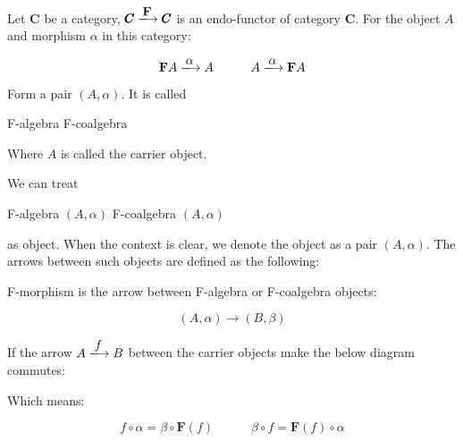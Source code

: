 \documentclass{article}
\begin{document}
\begin{definition}
Let $\pmb{C}$ be a category, $\pmb{C} \arrowto{\mathbf{F}} \pmb{C}$ is an endo-functor of category $\pmb{C}$. For the object $A$ and morphism $\alpha$ in this category:

\[
  \mathbf{F} A \arrowto{\alpha} A
  \quad \quad \quad
  A \arrowto{\alpha} \mathbf{F} A
\]

Form a pair $(A, \alpha)$. It is called

\begin{center}
  F-algebra \quad \quad \quad F-coalgebra
\end{center}

Where $A$ is called the carrier object.
\end{definition}

We can treat

\begin{center}
  F-algebra $(A, \alpha)$ \quad \quad \quad F-coalgebra $(A, \alpha)$
\end{center}

as object. When the context is clear, we denote the object as a pair $(A, \alpha)$. The arrows between such objects are defined as the following:

\begin{definition}
F-morphism is the arrow between F-algebra or F-coalgebra objects:

\[
  (A, \alpha) \longrightarrow (B, \beta)
\]

If the arrow $A \arrowto{f} B$ between the carrier objects make the below diagram commutes:

\begin{center}
\end{center}

Which means:

\[
  f \circ \alpha = \beta \circ \mathbf{F}(f)
  \quad \quad \quad
  \beta \circ f = \mathbf{F}(f) \circ \alpha
\]
\end{definition}
\end{document}
